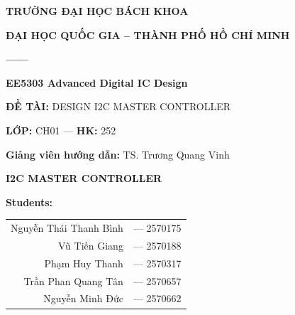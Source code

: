 \documentclass[12pt,a4paper]{article}
\begin{document}
\begin{titlepage}


    \centering
    \vspace*{0.5cm}

    {\fontsize{14}{17}\selectfont \textbf{TRƯỜNG ĐẠI HỌC BÁCH KHOA}}
    \vspace{0.2cm}

    {\fontsize{14}{17}\selectfont \textbf{ĐẠI HỌC QUỐC GIA -- THÀNH PHỐ HỒ CHÍ MINH}}
    \vspace{0.3cm}

    {\color{bkblue} \textbf{------}}
    \vspace{0.8cm}

    {\fontsize{14}{17}\selectfont \textbf{EE5303 Advanced Digital IC Design}}
    \vspace{0.35cm}

    {\fontsize{13}{16}\selectfont \textbf{ĐỀ TÀI:} DESIGN I2C MASTER CONTROLLER}
    \vspace{0.25cm}

    {\fontsize{13}{16}\selectfont \textbf{LỚP:} CH01 --- \textbf{HK:} 252}
    \vspace{0.25cm}

    {\fontsize{13}{16}\selectfont \textbf{Giảng viên hướng dẫn:} TS. Trương Quang Vinh}
    \vspace{0.9cm}

    {\fontsize{16}{20}\selectfont \textbf{I2C MASTER CONTROLLER}}
    \vspace{1.2cm}

    {\fontsize{13}{16}\selectfont \textbf{Students:}}
    \vspace{0.5cm}

    \renewcommand{\arraystretch}{1.35}
    \fontsize{12}{14}\selectfont
    \begin{tabular}{r l}
        Nguyễn Thái Thanh Bình & --- 2570175 \\
        Vũ Tiến Giang & --- 2570188 \\
        Phạm Huy Thanh & --- 2570317 \\
        Trần Phan Quang Tân & --- 2570657 \\
        Nguyễn Minh Đức & --- 2570662 \\
    \end{tabular}


\end{titlepage}
\end{document}
